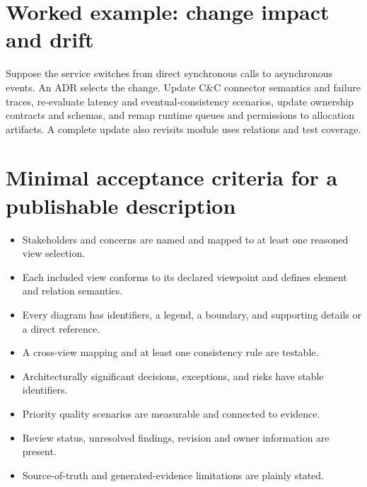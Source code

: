 \documentclass[10pt,letterpaper]{article}
\begin{document}
\section{Worked example: change impact and drift}
Suppose the service switches from direct synchronous calls to asynchronous events. An ADR selects the change. Update C\&C connector semantics and failure traces, re-evaluate latency and eventual-consistency scenarios, update ownership contracts and schemas, and remap runtime queues and permissions to allocation artifacts. A complete update also revisits module uses relations and test coverage.

\section{Minimal acceptance criteria for a publishable description}
\begin{itemize}
\item Stakeholders and concerns are named and mapped to at least one reasoned view selection.
\item Each included view conforms to its declared viewpoint and defines element and relation semantics.
\item Every diagram has identifiers, a legend, a boundary, and supporting details or a direct reference.
\item A cross-view mapping and at least one consistency rule are testable.
\item Architecturally significant decisions, exceptions, and risks have stable identifiers.
\item Priority quality scenarios are measurable and connected to evidence.
\item Review status, unresolved findings, revision and owner information are present.
\item Source-of-truth and generated-evidence limitations are plainly stated.
\end{itemize}
\end{document}
